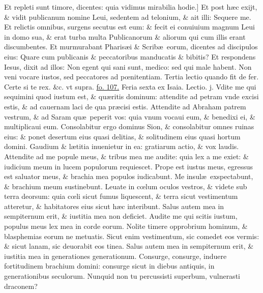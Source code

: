 \documentclass[a5paper,10pt]{book}
\def\rightmarginnote{%
	\lrmarginnote{\hskip\columnwidth \hskip -1em}}
\def\ae{æ}
\def\oe{œ}
\begin{document}
\begin{multicols*}{2}
Et repleti sunt timore, dicentes: quia vidimus mirabilia hodie.]
Et\rightmarginnote{D} post h\ae c exijt, \& vidit publicanum nomine Leui, sedentem ad telonium, \& ait illi: Sequere me. Et relictis omnibus, surgens secutus est eum: \& fecit ei conuiuium magnum Leui in domo sua, \& erat turba multa Publicanorum \& aliorum qui cum illis erant discumbentes.
Et murmurabant Pharis\ae i \& Scrib\ae \ eorum, dicentes ad discipulos eius: Quare cum publicanis \& peccatoribus manducatis \& bibitis?
Et respondens Iesus, dixit ad illos: Non egent qui sani sunt, medico: sed qui male habent.
Non veni vocare iustos, sed peccatores ad p\oe nitentiam.
\newline \color{red} Tertia lectio quando fit de fer. \color{black} Certe si te rex. \color{red} \&c. vt supra. \color{black} \hyperlink{page.107}{fo. 107.}
\newline {} \color{red} \hypertarget{FRI-SECUNDA-ADV}{Feria sexta} ex Isaia. \hfill Lectio. j. \color{black}
\vspace{-.25em}
Vdite me\rightmarginnote{c. 51.} qui sequimini quod iustum est, \& qu\ae ritis dominum: attendite ad petram vnde excisi estis, \& ad cauernam laci de qua pr\ae cisi estis.
Attendite ad Abraham patrem vestrum, \& ad Saram qu\ae \ peperit vos: quia vnum vocaui eum, \& benedixi ei, \& multiplicaui eum.
Consolabitur ergo dominus Sion, \& consolabitur omnes ruinas eius: \& ponet desertum eius quasi delitias, \& solitudinem eius quasi hortum domini.
Gaudium \& l\ae titia inuenietur in ea: gratiarum actio, \& vox laudis.
Attendite ad me popule meus, \& tribus mea me audite: quia lex a me exiet: \& iudicium meum in lucem populorum requiescet.
Prope est iustus meus, egressus est saluator meus, \& brachia mea populos iudicabunt.
Me insul\ae \ exspectabunt, \& brachium meum sustinebunt.
Leuate in c\oe lum oculos vestros, \& videte sub terra deorsum: quia c\oe li sicut fumus liquescent, \& terra sicut vestimentum atteretur, \& habitatores eius sicut h\ae c interibunt.
Salus autem mea in sempiternum erit, \& iustitia mea non deficiet.
Audite me qui scitis iustum, populus meus lex mea in corde eorum.
Nolite timere opprobrium hominum, \& blasphemias eorum ne metuatis.
Sicut enim vestimentum, sic comedet eos vermis: \& sicut lanam, sic deuorabit eos tinea.
Salus autem mea in sempiternum erit, \& iustitia mea in generationes generationum.
Consurge, consurge, induere fortitudinem brachium domini: consurge sicut in diebus antiquis, in generationibus seculorum.
Nunquid non tu percussisti superbum, vulnerasti draconem?

\end{multicols*}
\end{document}
